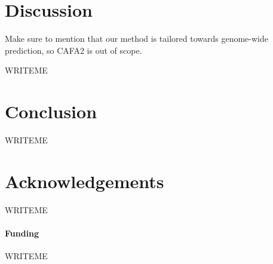 \documentclass{bioinfo}
\begin{document}
\section{Discussion}

Make sure to mention that our method is tailored towards genome-wide
prediction, so CAFA2 is out of scope.

WRITEME



\section{Conclusion}

WRITEME



\section*{Acknowledgements}

WRITEME



\paragraph{Funding\textcolon}

WRITEME




\end{document}
